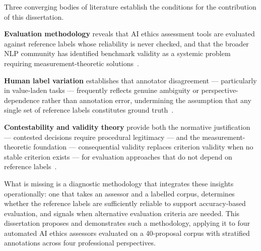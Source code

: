 Three converging bodies of literature establish the conditions for the
contribution of this dissertation.

\textbf{Evaluation methodology} reveals that AI ethics assessment tools are
evaluated against reference labels whose reliability is never checked, and
that the broader NLP community has identified benchmark validity as a systemic
problem requiring measurement-theoretic solutions~\cite{bowman2021, raji2021,
ecbd2024, belz2025qcet}.

\textbf{Human label variation} establishes that annotator disagreement ---
particularly in value-laden tasks --- frequently reflects genuine ambiguity or
perspective-dependence rather than annotation error, undermining the assumption
that any single set of reference labels constitutes ground truth~\cite{aroyo2015,
plank2022, uma2021, pavlick2019, basile2021, gordon2022}.

\textbf{Contestability and validity theory} provide both the normative
justification --- contested decisions require procedural legitimacy --- and
the measurement-theoretic foundation --- consequential validity replaces
criterion validity when no stable criterion exists --- for evaluation
approaches that do not depend on reference labels~\cite{messick1995,
alfrink2023contestable, henin2022, hildebrandt2019agonistic, huang2025moderation}.

What is missing is a diagnostic methodology that integrates these insights
operationally: one that takes an assessor and a labelled corpus, determines
whether the reference labels are sufficiently reliable to support
accuracy-based evaluation, and signals when alternative evaluation criteria
are needed.  This dissertation proposes and demonstrates such a methodology,
applying it to four automated AI ethics assessors evaluated on a 40-proposal
corpus with stratified annotations across four professional perspectives.
